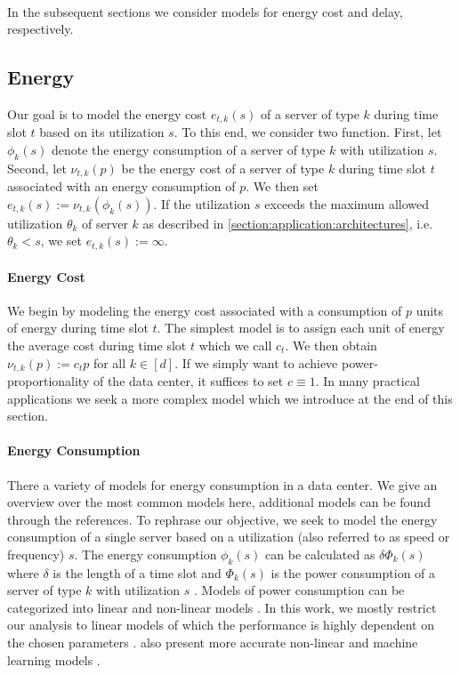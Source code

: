 \paragraph{}{In the subsequent sections we consider models for energy cost and delay, respectively.}

\subsection{Energy}\label{section:application:operating_cost:energy}

Our goal is to model the energy cost $e_{t,k}(s)$ of a server of type $k$ during time slot $t$ based on its utilization $s$. To this end, we consider two function. First, let $\phi_k(s)$ denote the energy consumption of a server of type $k$ with utilization $s$. Second, let $\nu_{t,k}(p)$ be the energy cost of a server of type $k$ during time slot $t$ associated with an energy consumption of $p$. We then set $e_{t,k}(s) := \nu_{t,k}(\phi_k(s))$. If the utilization $s$ exceeds the maximum allowed utilization $\theta_k$ of server $k$ as described in \autoref{section:application:architectures}, i.e. $\theta_k < s$, we set $e_{t,k}(s) := \infty$.

\paragraph{Energy Cost} We begin by modeling the energy cost associated with a consumption of $p$ units of energy during time slot $t$. The simplest model is to assign each unit of energy the average cost during time slot $t$ which we call $c_t$. We then obtain $\nu_{t,k}(p) := c_t p$ for all $k \in [d]$. If we simply want to achieve power-proportionality of the data center, it suffices to set $c \equiv 1$. In many practical applications we seek a more complex model which we introduce at the end of this section.

\paragraph{Energy Consumption} There a variety of models for energy consumption in a data center. We give an overview over the most common models here, additional models can be found through the references. To rephrase our objective, we seek to model the energy consumption of a single server based on a utilization (also referred to as speed or frequency) $s$. The energy consumption $\phi_k(s)$ can be calculated as $\delta \Phi_k(s)$ where $\delta$ is the length of a time slot and $\Phi_k(s)$ is the power consumption of a server of type $k$ with utilization $s$ \cite{Dayarathna2016}. Models of power consumption can be categorized into linear and non-linear models \cite{Ismail2020}. In this work, we mostly restrict our analysis to linear models of which the performance is highly dependent on the chosen parameters \cite{Ismail2020}. \citeauthor*{Ismail2020} also present more accurate non-linear and machine learning models \cite{Ismail2020}.

